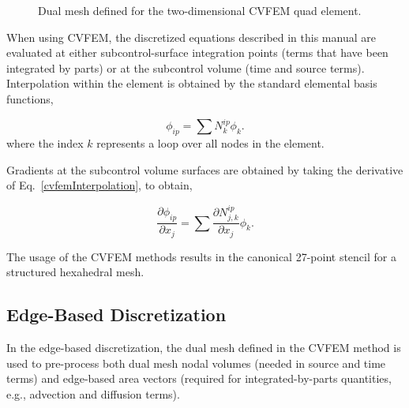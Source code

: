 \begin{figure}
  \centering
  \vspace{0.1in}
  \caption{Dual mesh defined for the two-dimensional CVFEM quad element.}
  \label{cvfemP1_P2}
\end{figure}

When using CVFEM, the discretized equations described in this manual
are evaluated at either subcontrol-surface integration points (terms that
have been integrated by parts) or at the subcontrol volume (time and
source terms). Interpolation within the element is obtained by the
standard elemental basis functions,

\begin{equation}
\phi_{ip} = \sum N^{ip}_k \phi_k.
\label{cvfemInterpolation}
\end{equation}
%
where the index $k$ represents a loop over all nodes in the element.

Gradients at the subcontrol volume surfaces are obtained by taking the derivative
of Eq.~\ref{cvfemInterpolation}, to obtain,

\begin{equation}
\frac{\partial \phi_{ip}}{\partial x_j} = \sum \frac{\partial N^{ip}_{j,k}} {\partial x_j} \phi_k.
\label{cvfemDerivative}
\end{equation}

The usage of the CVFEM methods results in the canonical 27-point stencil
for a structured hexahedral mesh.

\subsection{Edge-Based Discretization}
In the edge-based discretization, the dual mesh defined in the CVFEM
method is used to pre-process both dual mesh nodal volumes (needed in
source and time terms) and edge-based area vectors (required for integrated-by-parts
quantities, e.g., advection and diffusion terms).


